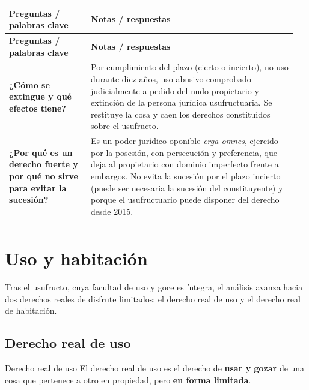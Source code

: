 \documentclass[12pt,oneside]{book}
\makeatletter
\newenvironment{cornell}{%
    \par\vspace{0.5em}
    \noindent
    \begin{longtable}{@{}>{\raggedright\arraybackslash}p{0.27\linewidth}
                         >{\raggedright\arraybackslash}p{0.68\linewidth}@{}}
    \toprule
    \textbf{Preguntas / palabras clave} & \textbf{Notas / respuestas} \\
    \midrule
    \endfirsthead
    \toprule
    \textbf{Preguntas / palabras clave} & \textbf{Notas / respuestas} \\
    \midrule
    \endhead
}{%
    \bottomrule
    \end{longtable}
}
\newcommand{\cornellsummary}[1]{%
    \midrule
    \multicolumn{2}{@{}p{\dimexpr0.95\linewidth+2\tabcolsep\relax}@{}}{%
        \vspace{0.2em}\textbf{Resumen:} #1\vspace{0.2em}} \\
}
\makeatother
\begin{document}
\begin{cornell}
\textbf{¿Cómo se extingue y qué efectos tiene?} &
Por cumplimiento del plazo (cierto o incierto), no uso durante diez años, uso abusivo comprobado judicialmente a pedido del nudo propietario y extinción de la persona jurídica usufructuaria. Se restituye la cosa y caen los derechos constituidos sobre el usufructo. \\

\textbf{¿Por qué es un derecho fuerte y por qué no sirve para evitar la sucesión?} &
Es un poder jurídico oponible \textit{erga omnes}, ejercido por la posesión, con persecución y preferencia, que deja al propietario con dominio imperfecto frente a embargos. No evita la sucesión por el plazo incierto (puede ser necesaria la sucesión del constituyente) y porque el usufructuario puede disponer del derecho desde 2015. \\

\cornellsummary{El usufructo (art.~2129) permite usar, gozar y disponer jurídicamente de un bien ajeno sin alterar su sustancia. Es temporal (vitalicio si nada se dice), intransmisible a herederos, oponible \textit{erga omnes} y subsiste ante el cambio de titularidad de la nuda propiedad. Se constituye por consenso o testamento, nunca judicialmente. El usufructuario debe inventariar, conservar y restituir; el nudo propietario no puede afectar el uso y goce (art.~2151). Se extingue por plazo, no uso durante diez años o uso abusivo, y no es un instrumento adecuado para evitar la sucesión.}
\end{cornell}

\chapter{Uso y habitación}\label{cap:usohab}

Tras el usufructo, cuya facultad de uso y goce es íntegra, el análisis avanza hacia dos derechos reales de disfrute limitados: el derecho real de uso y el derecho real de habitación.

\section{Derecho real de uso}

\begin{definition}{Derecho real de uso}
El derecho real de uso es el derecho de \textbf{usar y gozar} de una cosa que pertenece a otro en propiedad, pero \textbf{en forma limitada}.
\end{definition}
\end{document}
